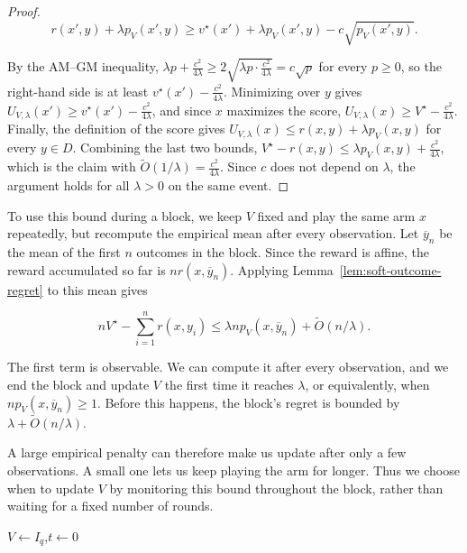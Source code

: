 {\begin{proof}
\begin{equation*}
r(x',y)+\lambda p_V(x',y)\ge v^\star(x')+\lambda p_V(x',y)-c\sqrt{p_V(x',y)}.
\end{equation*}

By the AM--GM inequality,
$\lambda p+\frac{c^2}{4\lambda}\ge2\sqrt{\lambda p\cdot\frac{c^2}{4\lambda}}=c\sqrt{p}$
for every $p\ge0$, so the right-hand side is at least
$v^\star(x')-\frac{c^2}{4\lambda}$. Minimizing over $y$ gives
$U_{V,\lambda}(x')\ge v^\star(x')-\frac{c^2}{4\lambda}$, and since $x$
maximizes the score, $U_{V,\lambda}(x)\ge V^\star-\frac{c^2}{4\lambda}$.
Finally, the definition of the score gives
$U_{V,\lambda}(x)\le r(x,y)+\lambda p_V(x,y)$ for every $y\in D$. Combining
the last two bounds,
$V^\star-r(x,y)\le\lambda p_V(x,y)+\frac{c^2}{4\lambda}$, which is the claim
with $\tilde{O}(1/\lambda)=\frac{c^2}{4\lambda}$. Since $c$ does not depend on
$\lambda$, the argument holds for all $\lambda>0$ on the same event.
\end{proof}

To use this bound during a block, we keep $V$ fixed and play the same
arm $x$ repeatedly, but recompute the empirical mean after every
observation. Let ${\overline{y}}_n$ be the mean of the first $n$ outcomes
in the block. Since the reward is affine, the reward accumulated so far
is $n r(x,{\overline{y}}_n)$. Applying Lemma~\ref{lem:soft-outcome-regret}
to this mean gives

\begin{equation*}
n V^\star-\sum_{i=1}^n r(x,y_i)
\le \lambda n p_V(x,{\overline{y}}_n)+\tilde{O}(n/\lambda).
\end{equation*}

The first term is observable. We can compute it after every observation,
and we end the block and update $V$ the first time it reaches $\lambda$,
or equivalently, when $n p_V(x,{\overline{y}}_n)\ge1$.
Before this happens, the block's regret is bounded by
$\lambda+\tilde{O}(n/\lambda)$.

A large empirical penalty can therefore make us update after only a
few observations. A small one lets us keep playing the arm for longer. Thus we choose when to update $V$ by monitoring this bound
throughout the block, rather than waiting for a fixed number of rounds.

\begin{algorithm2e}[!htbp]
\caption{}\label{alg:soft-square-root}
$V\leftarrow I_q$,\quad $t\leftarrow0$\;
\end{algorithm2e}

}
